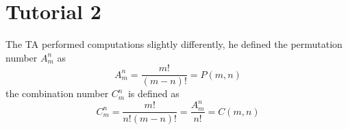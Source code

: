 \section{Tutorial 2}
The TA performed computations slightly differently, he defined the permutation number $A_m^n$ as
\[
A_m^n = \frac{m!}{(m-n)!}=  P(m, n)
\]
the combination number $C_m^n$ is defined as
\[
C_m^n = \frac{m!}{n!(m-n)!} = \frac{A_m^n}{n!} = C(m, n)
\]
